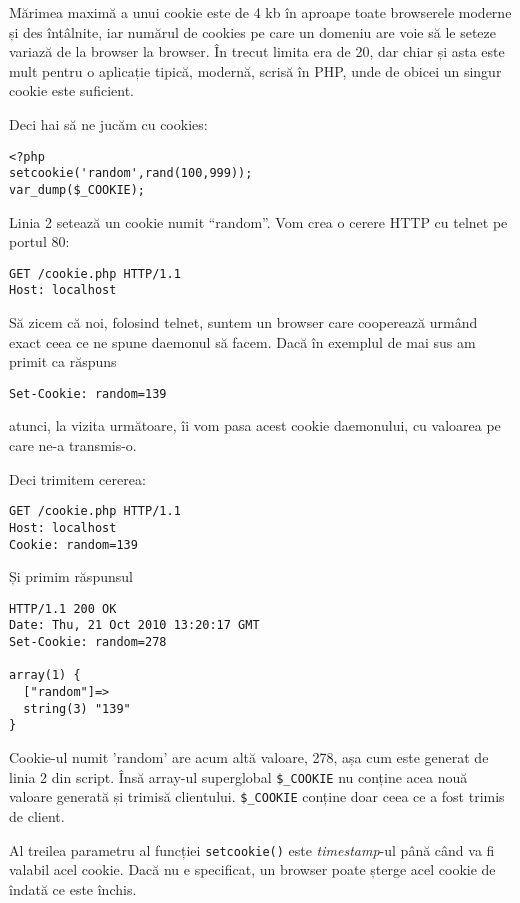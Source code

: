 Mărimea maximă a unui cookie este de 4 kb \^in aproape toate browserele moderne și
des \^int\^alnite, iar numărul de cookies pe care un domeniu are voie să
le seteze variază de la browser la browser. \^In trecut limita era de
20, dar chiar și asta este mult pentru o aplicație tipică,
modernă, scrisă \^in PHP,
unde de obicei un singur cookie este suficient.

Deci hai să ne jucăm cu cookies:

\begin{lstlisting}[title=Folosirea cookie-urilor]
<?php
setcookie('random',rand(100,999));
var_dump($_COOKIE);
\end{lstlisting}

Linia 2 setează un cookie numit ``random''.
Vom crea o cerere HTTP cu telnet pe portul 80:
\begin{verbatim}
GET /cookie.php HTTP/1.1
Host: localhost

\end{verbatim}

Să zicem că noi, folosind telnet, suntem un browser care cooperează urm\^and
exact ceea ce ne spune daemonul să facem.
Dacă \^in exemplul de mai sus am primit ca răspuns
\begin{verbatim}
Set-Cookie: random=139
\end{verbatim}
atunci, la vizita următoare, \^ii vom pasa acest cookie daemonului,
cu valoarea pe care ne-a transmis-o.

Deci trimitem cererea:
\begin{verbatim}
GET /cookie.php HTTP/1.1
Host: localhost
Cookie: random=139

\end{verbatim} 
Și primim răspunsul
\begin{verbatim}
HTTP/1.1 200 OK
Date: Thu, 21 Oct 2010 13:20:17 GMT
Set-Cookie: random=278

array(1) {
  ["random"]=>
  string(3) "139"
}
\end{verbatim} 

Cookie-ul numit 'random' are acum altă valoare, 278, așa cum este generat de linia 2 din script. \^Insă
array-ul superglobal \texttt{\$\_COOKIE} nu conține acea nouă valoare generată și trimisă
clientului. \texttt{\$\_COOKIE} conține doar ceea ce a fost trimis de client.


Al treilea parametru al funcției \texttt{setcookie()} este \textsl{timestamp}-ul p\^ană
c\^and va fi valabil acel cookie. Dacă nu e specificat, un browser poate
șterge acel cookie de \^indată ce este \^inchis. 

